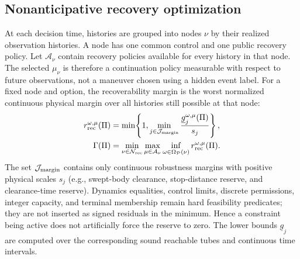 \documentclass[letterpaper]{article} %
\begin{document}
\subsection{Nonanticipative recovery optimization}
\label{sec:opt}
At each decision time, histories are grouped into nodes $\nu$ by their
realized observation histories. A node has one common control and one public
recovery policy. Let $\mathcal A_\nu$ contain recovery policies available
for every history in that node. The selected $\mu_\nu$ is therefore a
continuation policy measurable with respect to future observations, not a
maneuver chosen using a hidden event label. For a fixed node and option, the
recoverability margin is the worst normalized continuous physical margin over
all histories still possible at that node:
\begin{equation}
\begin{aligned}
r_{\rm rec}^{\omega,\mu}(\Pi)
&=\min\!\left\{1,\min_{j\in\mathcal J_{\rm margin}}
\frac{\underline g_j^{\omega,\mu}(\Pi)}{s_j}\right\},\\
\Gamma(\Pi)&=\min_{\nu\in\mathcal N_{\rm rec}}
\max_{\mu\in\mathcal A_\nu}
\inf_{\omega\in\Omega_{\mathcal P}(\nu)}
r_{\rm rec}^{\omega,\mu}(\Pi).
\end{aligned}
\label{eq:reserve}
\end{equation}
The set $\mathcal J_{\rm margin}$ contains only continuous robustness
margins with positive physical scales $s_j$ (e.g., swept-body clearance,
stop-distance reserve, and clearance-time reserve). Dynamics equalities,
control limits, discrete permissions, integer capacity, and terminal
membership remain hard feasibility predicates; they are not inserted as
signed residuals in the minimum. Hence a constraint being active does not
artificially force the reserve to zero. The lower bounds $\underline g_j$
are computed over the corresponding sound reachable tubes and continuous
time intervals.
\end{document}
